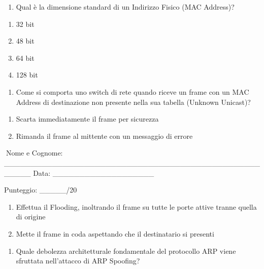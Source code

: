 \documentclass[11pt,a4paper]{article}
\providecommand{\tightlist}{%
  \setlength{\itemsep}{0pt}\setlength{\parskip}{0pt}}
\begin{document}
\begin{enumerate}
\def\labelenumi{\arabic{enumi}.}
\setcounter{enumi}{3}
\tightlist
\item
  Qual è la dimensione standard di un Indirizzo Fisico (MAC Address)?
\end{enumerate}

\begin{enumerate}
\def\labelenumi{\Alph{enumi})}
\tightlist
\item
  32 bit
\item
  48 bit
\item
  64 bit
\item
  128 bit
\end{enumerate}

\begin{enumerate}
\def\labelenumi{\arabic{enumi}.}
\setcounter{enumi}{4}
\tightlist
\item
  Come si comporta uno switch di rete quando riceve un frame con un MAC
  Address di destinazione non presente nella sua tabella (Unknown
  Unicast)?
\end{enumerate}

\begin{enumerate}
\def\labelenumi{\Alph{enumi})}
\tightlist
\item
  Scarta immediatamente il frame per sicurezza
\item
  Rimanda il frame al mittente con un messaggio di errore
\end{enumerate}

Nome e Cognome:
\_\_\_\_\_\_\_\_\_\_\_\_\_\_\_\_\_\_\_\_\_\_\_\_\_\_\_\_\_\_\_\_\_\_\_\_\_\_\_\_\_\_\_\_\_\_\_\_\_\_\_\_\_
Data: \_\_\_\_\_\_\_\_\_\_\_\_\_\_\_\_\_\_\_

Punteggio: \_\_\_\_\_/20

\begin{enumerate}
\def\labelenumi{\Alph{enumi})}
\setcounter{enumi}{2}
\tightlist
\item
  Effettua il Flooding, inoltrando il frame su tutte le porte attive
  tranne quella di origine
\item
  Mette il frame in coda aspettando che il destinatario si presenti
\end{enumerate}

\begin{enumerate}
\def\labelenumi{\arabic{enumi}.}
\setcounter{enumi}{5}
\tightlist
\item
  Quale debolezza architetturale fondamentale del protocollo ARP viene
  sfruttata nell'attacco di ARP Spoofing?
\end{enumerate}
\end{document}
